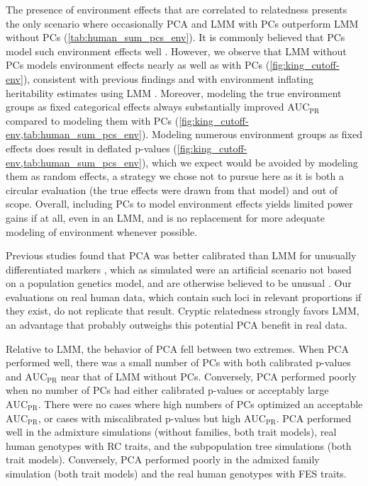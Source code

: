 \documentclass[11pt]{article}
\newcommand{\auc}{\text{AUC}_\text{PR}}
\begin{document}
\begin{linenumbers}
The presence of environment effects that are correlated to relatedness presents the only scenario where occasionally PCA and LMM with PCs outperform LMM without PCs (\cref{tab:human_sum_pcs_env}).
It is commonly believed that PCs model such environment effects well \citep{novembre_genes_2008, zhang_principal_2015, lin_admixed_2021}.
However, we observe that LMM without PCs models environment effects nearly as well as with PCs (\cref{fig:king_cutoff-env}), consistent with previous findings \citep{vilhjalmsson_nature_2013, wang_trade-offs_2022} and with environment inflating heritability estimates using LMM \citep{heckerman_linear_2016}.
Moreover, modeling the true environment groups as fixed categorical effects always substantially improved $\auc$ compared to modeling them with PCs (\cref{fig:king_cutoff-env,tab:human_sum_pcs_env}).
Modeling numerous environment groups as fixed effects does result in deflated p-values (\cref{fig:king_cutoff-env,tab:human_sum_pcs_env}), which we expect would be avoided by modeling them as random effects, a strategy we chose not to pursue here as it is both a circular evaluation (the true effects were drawn from that model) and out of scope.
Overall, including PCs to model environment effects yields limited power gains if at all, even in an LMM, and is no replacement for more adequate modeling of environment whenever possible.

Previous studies found that PCA was better calibrated than LMM for unusually differentiated markers \citep{price_new_2010, wu_comparison_2011, yang_advantages_2014}, which as simulated were an artificial scenario not based on a population genetics model, and are otherwise believed to be unusual \citep{sul_mixed_2013, price_response_2013}.
Our evaluations on real human data, which contain such loci in relevant proportions if they exist, do not replicate that result.
Cryptic relatedness strongly favors LMM, an advantage that probably outweighs this potential PCA benefit in real data.

Relative to LMM, the behavior of PCA fell between two extremes.
When PCA performed well, there was a small number of PCs with both calibrated p-values and $\auc$ near that of LMM without PCs.
Conversely, PCA performed poorly when no number of PCs had either calibrated p-values or acceptably large $\auc$.
There were no cases where high numbers of PCs optimized an acceptable $\auc$, or cases with miscalibrated p-values but high $\auc$.
PCA performed well in the admixture simulations (without families, both trait models), real human genotypes with RC traits, and the subpopulation tree simulations (both trait models).
Conversely, PCA performed poorly in the admixed family simulation (both trait models) and the real human genotypes with FES traits.


\end{linenumbers}
\end{document}
